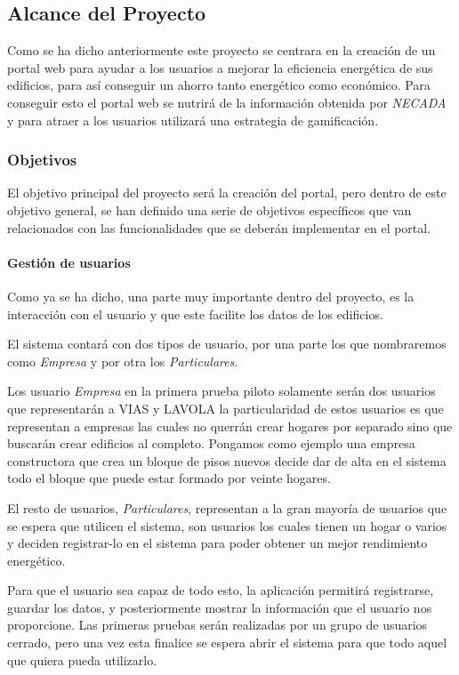 \subsection{Alcance del Proyecto}\label{sec:alcance}
Como se ha dicho anteriormente este proyecto se centrara en la creación de un portal web para ayudar a los usuarios a mejorar la eficiencia energética de sus edificios, para así conseguir un ahorro tanto energético como económico. Para conseguir esto el portal web se nutrirá de la información obtenida por \textit{NECADA} y para atraer a los usuarios utilizará una estrategia de gamificación.

\subsubsection{Objetivos}
El objetivo principal del proyecto será la creación del portal, pero dentro de este objetivo general, se han definido una serie de objetivos específicos que van relacionados con las funcionalidades que se deberán implementar en el portal.
\paragraph{Gestión de usuarios}
Como ya se ha dicho, una parte muy importante dentro del proyecto, es la interacción con el usuario y que este facilite los datos de los edificios.

El sistema contará con dos tipos de usuario, por una parte los que nombraremos como \textit{Empresa} y por otra los \textit{Particulares}.

  Los usuario \textit{Empresa} en la primera prueba piloto solamente serán dos usuarios que representarán a VIAS y LAVOLA la particularidad de estos usuarios es que representan a empresas las cuales no querrán crear hogares por separado sino que buscarán crear edificios al completo. Pongamos como ejemplo una empresa constructora que crea un bloque de pisos nuevos decide dar de alta en el sistema todo el bloque que puede estar formado por veinte hogares.
  
  El resto de usuarios, \textit{Particulares}, representan a la gran mayoría de usuarios que se espera que utilicen el sistema, son usuarios los cuales tienen un hogar o varios y deciden registrar-lo en el sistema para poder obtener un mejor rendimiento energético.
  
  Para que el usuario sea capaz de todo esto, la aplicación permitirá registrarse, guardar los datos, y posteriormente mostrar la información que el usuario nos proporcione. Las primeras pruebas serán realizadas por un grupo de usuarios cerrado, pero una vez esta finalice se espera abrir el sistema para que todo aquel que quiera pueda utilizarlo.
